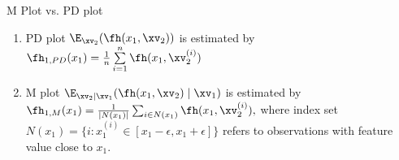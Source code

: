 \documentclass[10pt,compress,t,notes=noshow, xcolor=table]{beamer}
\begin{document}
\begin{framev}[align=top]{M Plot vs. PD plot}
\begin{enumerate}[<+->]
\item[a)] PD plot $\E_{\xv_2}(\fh(x_1, \xv_2))$ is estimated by $ \fh_{1, PD}(x_1) = \frac{1}{n} \sum\limits_{i=1}^n \fh(x_1, \xv_2^{(i)})$
\item[b)] M plot $\E_{\xv_2|\xv_1}(\fh(x_1, \xv_2) \mid \xv_1)$ is
estimated by $\fh_{1, M}(x_1) = \textstyle\frac{1}{|N(x_1)|} \sum_{i \in N(x_1)} \fh(x_1, \xv_2^{(i)}),$
where index set $N(x_1) = \{i: x_1^{(i)} \in [x_1 - \epsilon, x_1 + \epsilon]\}$ refers to observations with feature value close to $x_1$. %
\end{enumerate}
\end{framev}
\end{document}
